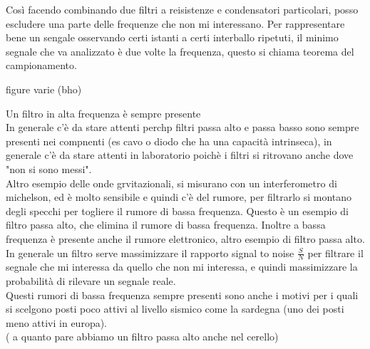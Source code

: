 \documentclass[a4paper, oneside]{article}
\begin{document}
Così facendo combinando due filtri a reisistenze e condensatori particolari, posso escludere una parte delle frequenze che non mi interessano.
Per rappresentare bene un sengale osservando certi istanti a certi interballo ripetuti, il minimo segnale che va analizzato è due volte la frequenza, questo si chiama teorema del campionamento.\\
\begin{center}
    figure varie (bho)
\end{center}
Un filtro in alta frequenza è sempre presente \\
In generale c'è da stare attenti perchp filtri passa alto e passa basso sono sempre presenti nei compnenti (es cavo o diodo che ha una capacità intrinseca), in generale c'è da stare attenti in laboratorio poichè 
i filtri si ritrovano anche dove "non si sono messi".\\
Altro esempio delle onde grvitazionali, si misurano con un interferometro di michelson, ed è molto sensibile e quindi c'è del rumore, per filtrarlo si montano degli specchi per togliere il rumore di bassa frequenza. 
Questo è un esempio di filtro passa alto, che elimina il rumore di bassa frequenza. Inoltre a bassa frequenza è presente anche il rumore elettronico, altro esempio di filtro passa alto.\\
In generale un filtro serve massimizzare il rapporto signal to noise $\frac{S}{N}$ per filtrare il segnale che mi interessa da quello che non mi interessa, e quindi massimizzare la probabilità di rilevare un segnale reale.\\
Questi rumori di bassa frequenza sempre presenti sono anche i motivi per i quali si scelgono posti poco attivi al livello sismico come la sardegna (uno dei posti meno attivi in europa).\\
( a quanto pare abbiamo un filtro passa alto anche nel cerello)\\
\end{document}
